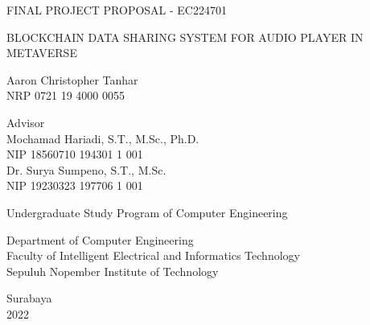 \begin{large}
  FINAL PROJECT PROPOSAL - EC224701
\end{large}

\vspace{\fill}

\begin{spacing}{1.5}
  \begin{Large}
    BLOCKCHAIN DATA SHARING SYSTEM FOR AUDIO PLAYER IN METAVERSE
  \end{Large}
\end{spacing}

\vspace{\fill}

\begin{large}
  Aaron Christopher Tanhar \\
  \textmd{NRP 0721 19 4000 0055}
\end{large}

\vspace{\fill}

\begin{large}
  \textmd{Advisor} \\
  Mochamad Hariadi, S.T., M.Sc., Ph.D. \\
  \textmd{NIP 18560710 194301 1 001} \\
  Dr. Surya Sumpeno, S.T., M.Sc. \\
  \textmd{NIP 19230323 197706 1 001}
\end{large}

\vspace{\fill}

Undergraduate Study Program of Computer Engineering \\

\mdseries

Department of Computer Engineering \\
Faculty of Intelligent Electrical and Informatics Technology \\
Sepuluh Nopember Institute of Technology

Surabaya \\
2022

